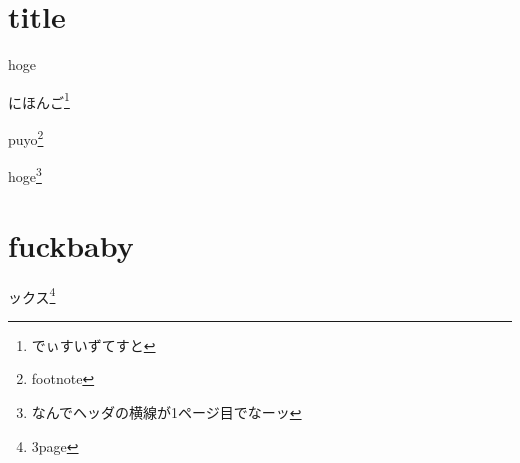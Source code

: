 \documentclass{word-lua}
\author{著者}
\subtitle{fuck}
\begin{document}
\chapter*{title}

hoge

にほんご\footnote{でぃすいずてすと}

puyo\footnote{footnote}

\newpage

hoge\footnote{なんでヘッダの横線が1ページ目でなーッ}

\newpage

\chapter*{fuckbaby}

ックス\footnote{3page}
\end{document}
